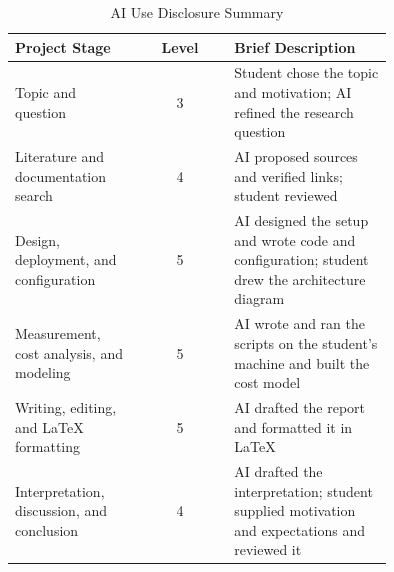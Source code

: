 \documentclass[conference,a4paper]{IEEEtran}
\begin{document}
\begin{table}[htbp]
	\caption{AI Use Disclosure Summary}
	\label{tab:ai_use}
	\centering
	\footnotesize
	\begin{tabular}{|p{0.33\linewidth}|c|p{0.42\linewidth}|}
		\hline
		\textbf{Project Stage} & \textbf{Level} & \textbf{Brief Description} \\
		\hline
		Topic and question & 3 & Student chose the topic and motivation; AI refined the research question \\
		\hline
		Literature and documentation search & 4 & AI proposed sources and verified links; student reviewed \\
		\hline
		Design, deployment, and configuration & 5 & AI designed the setup and wrote code and configuration; student drew the architecture diagram \\
		\hline
		Measurement, cost analysis, and modeling & 5 & AI wrote and ran the scripts on the student's machine and built the cost model \\
		\hline
		Writing, editing, and LaTeX formatting & 5 & AI drafted the report and formatted it in LaTeX \\
		\hline
		Interpretation, discussion, and conclusion & 4 & AI drafted the interpretation; student supplied motivation and expectations and reviewed it \\
		\hline
	\end{tabular}
\end{table}
\end{document}
